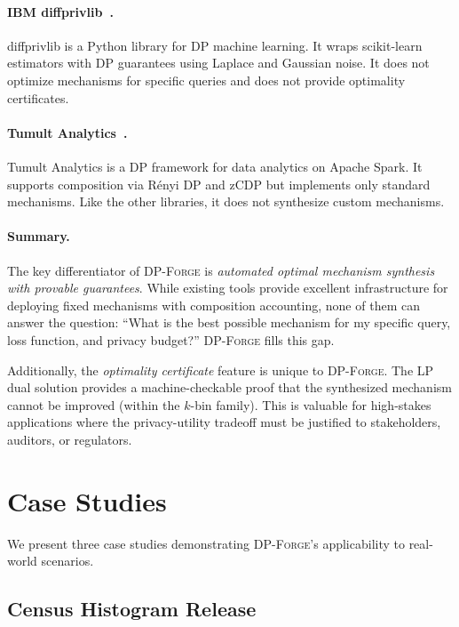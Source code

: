 \documentclass[11pt,a4paper]{article}
\newcommand{\dpforge}{\textsc{DP-Forge}}
\begin{document}
\paragraph{IBM diffprivlib~\cite{holohan2019diffprivlib}.}
diffprivlib is a Python library for DP machine learning.  It wraps scikit-learn
estimators with DP guarantees using Laplace and Gaussian noise.  It does not
optimize mechanisms for specific queries and does not provide optimality
certificates.

\paragraph{Tumult Analytics~\cite{tumult2022}.}
Tumult Analytics is a DP framework for data analytics on Apache Spark.  It
supports composition via R\'enyi DP and zCDP but implements only standard
mechanisms.  Like the other libraries, it does not synthesize custom mechanisms.

\paragraph{Summary.}
The key differentiator of \dpforge{} is \emph{automated optimal mechanism
synthesis with provable guarantees}.  While existing tools provide excellent
infrastructure for deploying fixed mechanisms with composition accounting,
none of them can answer the question: ``What is the best possible mechanism
for my specific query, loss function, and privacy budget?''  \dpforge{} fills
this gap.

Additionally, the \emph{optimality certificate} feature is unique to \dpforge{}.
The LP dual solution provides a machine-checkable proof that the synthesized
mechanism cannot be improved (within the $k$-bin family).  This is valuable
for high-stakes applications where the privacy-utility tradeoff must be
justified to stakeholders, auditors, or regulators.

\section{Case Studies}
\label{sec:casestudies}

We present three case studies demonstrating \dpforge{}'s applicability to
real-world scenarios.

\subsection{Census Histogram Release}
\end{document}
